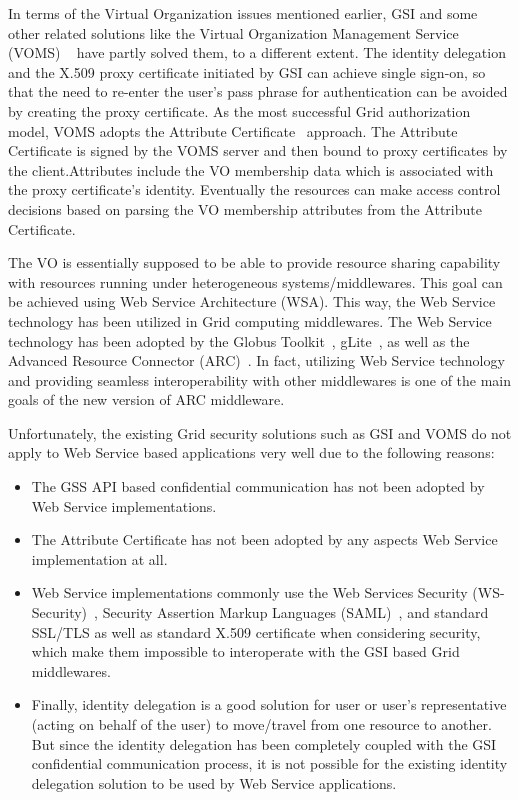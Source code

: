 \documentclass[twocolumn]{svjour3}         %
\begin{document}
In terms of the Virtual Organization issues mentioned earlier, GSI and some other related solutions like the Virtual Organization Management Service (VOMS) ~\cite{AlfieriR05} have partly solved them, to a different extent. The identity delegation and the X.509 proxy certificate initiated by GSI can achieve single sign-on, so that the need to re-enter the user’s pass phrase for authentication can be avoided by creating the proxy certificate.  As the most successful Grid authorization model, VOMS adopts the Attribute Certificate~\cite{RFC3821link} approach. The Attribute Certificate is signed by the VOMS server and then bound to proxy certificates by the client.Attributes include the VO membership data which is associated with the proxy certificate’s identity. Eventually the resources can make access control decisions based on parsing the VO membership attributes from the Attribute Certificate.

The VO is essentially supposed to be able to provide resource sharing capability with resources running under heterogeneous systems/middlewares. This goal can be achieved using Web Service Architecture (WSA). This way, the Web Service technology has been utilized in Grid computing middlewares. The Web Service technology has been adopted by the Globus Toolkit~\cite{GTlink}, gLite~\cite{gLitelink}, as well as the Advanced Resource Connector (ARC)~\cite{ARClink}. In fact, utilizing Web Service technology and providing seamless interoperability with other middlewares is one of the main goals of the new version of ARC middleware.

Unfortunately, the existing Grid security solutions such as GSI and VOMS do not apply to Web Service based applications very well due to the following reasons:
\begin{itemize}
\item The GSS API based confidential communication has not been adopted by Web Service implementations.
\item The Attribute Certificate has not been adopted by any aspects Web Service implementation at all.
\item Web Service implementations commonly use the Web Services Security (WS-Security)~\cite{WSSeclink}, Security Assertion Markup Languages (SAML)~\cite{SAMLlink}, and standard SSL/TLS as well as standard X.509 certificate when considering security, which make them impossible to interoperate with the GSI based Grid middlewares.
\item Finally, identity delegation is a good solution for user or user's representative (acting on behalf of the user) to move/travel from one resource to another. But since the identity delegation has been completely coupled with the GSI confidential communication process, it is not possible for the existing identity delegation solution to be used by Web Service applications.
\end{itemize}
\end{document}

